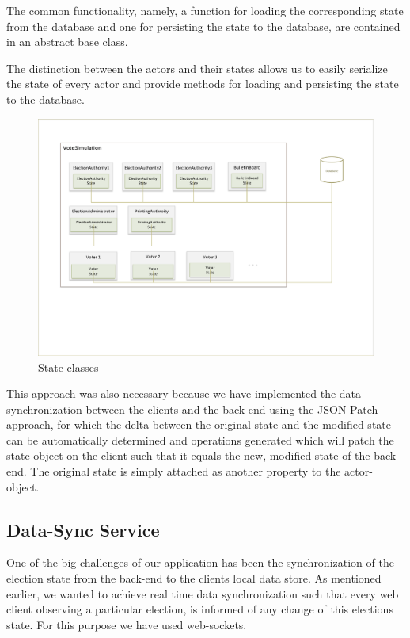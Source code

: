 The common functionality, namely, a function for loading the corresponding state from the database and one for persisting the state to the database, are contained in an abstract base class.

The distinction between the actors and their states allows us to easily serialize the state of every actor and provide methods for loading and persisting the state to the database.

\begin{figure}[h!]
\begin{center}
\includegraphics[scale=0.60]{assets/votesim.pdf}
\caption{State classes}
\end{center}
\end{figure}

This approach was also necessary because we have implemented the data synchronization between the clients and the back-end using the JSON Patch approach, for which the delta between the original state and the modified state can be automatically determined and operations generated which will patch the state object on the client such that it equals the new, modified state of the back-end. The original state is simply attached as another property to the actor-object. 

\subsection{Data-Sync Service}
One of the big challenges of our application has been the synchronization of the election state from the back-end to the clients local data store. As mentioned earlier, we wanted to achieve real time data synchronization such that every web client observing a particular election, is informed of any change of this elections state. For this purpose we have used web-sockets.

